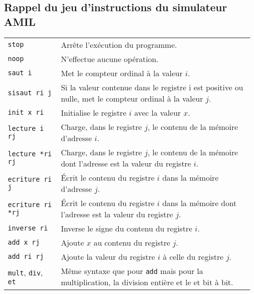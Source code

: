\documentclass[12pt,a4paper]{article}
\newcommand{\C}[1]{{\upshape\texttt{#1}}}
\begin{document}
\subsection*{Rappel du jeu d'instructions du simulateur AMIL}
\noindent
\begin{tabular}[c]{lp{13.2cm}}
  \C{stop} & Arrête l'exécution du programme.\\
  \C{noop} & N'effectue aucune opération.\\
  \C{saut i} & Met le compteur ordinal à la valeur $i$.\\
  \C{sisaut ri j} & Si la valeur contenue dans le registre i est positive ou nulle, met le compteur ordinal à la valeur $j$.\\
  \C{init x ri} & Initialise le registre $i$ avec la valeur $x$.\\
  \C{lecture i rj} & Charge, dans le registre $j$, le contenu de la mémoire d'adresse $i$.\\
  \C{lecture *ri rj} & Charge, dans le registre $j$, le contenu de la mémoire dont l'adresse est la valeur du registre $i$.\\
  \C{ecriture ri j} & Écrit le contenu du registre $i$ dans la mémoire d'adresse $j$.\\
  \C{ecriture ri *rj} & Écrit le contenu du registre $i$ dans la mémoire dont  l'adresse est la valeur du registre $j$.\\
  \C{inverse ri} & Inverse le signe du contenu du registre $i$.\\
  \C{add x rj} & Ajoute $x$ au contenu du registre $j$.\\
  \C{add ri rj} & Ajoute la valeur du registre $i$ à celle du registre $j$.\\
  \C{mult}, \C{div}, \C{et} & Même syntaxe que pour \C{add} mais pour la multiplication, la division entière et le et bit à bit.
\end{tabular}
\end{document}
